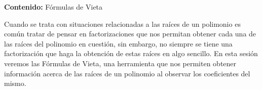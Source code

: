 {\Large
    \textbf{Contenido:} Fórmulas de Vieta
}

Cuando se trata con situaciones relacionadas a las raíces de un polimonio es común tratar de pensar en factorizaciones
que nos permitan obtener cada una de las raíces del polinomio en cuestión, sin embargo, no siempre se tiene una factorización que haga la obtención de estas raíces en algo sencillo.
En esta sesión veremos las Fórmulas de Vieta, una herramienta que nos permiten obtener información acerca de las raíces de un polinomio al observar los coeficientes del mismo.